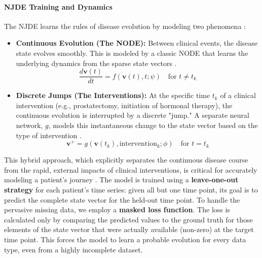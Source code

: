 \documentclass[11pt, a4paper]{article}
\begin{document}
\paragraph{NJDE Training and Dynamics}
The NJDE learns the rules of disease evolution by modeling two phenomena \cite{GwakSim2020}:
\begin{itemize}
    \item \textbf{Continuous Evolution (The NODE):} Between clinical events, the disease state evolves smoothly. This is modeled by a classic NODE that learns the underlying dynamics from the sparse state vectors \cite{BergHasenclever2018}.
    $$ \frac{d\mathbf{v}(t)}{dt} = f(\mathbf{v}(t), t; \psi) \quad \text{for } t \neq t_k $$
    \item \textbf{Discrete Jumps (The Interventions):} At the specific time $t_k$ of a clinical intervention (e.g., prostatectomy, initiation of hormonal therapy), the continuous evolution is interrupted by a discrete "jump." A separate neural network, $g$, models this instantaneous change to the state vector based on the type of intervention \cite{CuchieroLarsson2019, AbushaqraXue2022}.
    $$ \mathbf{v}^+ = g(\mathbf{v}(t_k), \text{intervention}_k; \phi) \quad \text{for } t = t_k $$
\end{itemize}
This hybrid approach, which explicitly separates the continuous disease course from the rapid, external impacts of clinical interventions, is critical for accurately modeling a patient's journey \cite{GwakSim2020}. The model is trained using a \textbf{leave-one-out strategy} for each patient's time series: given all but one time point, its goal is to predict the complete state vector for the held-out time point. To handle the pervasive missing data, we employ a \textbf{masked loss function}. The loss is calculated only by comparing the predicted values to the ground truth for those elements of the state vector that were actually available (non-zero) at the target time point. This forces the model to learn a probable evolution for every data type, even from a highly incomplete dataset.
\end{document}
